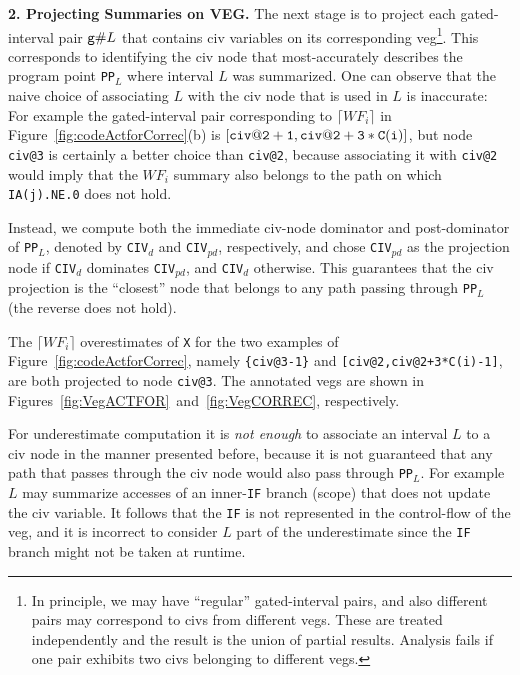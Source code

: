 \documentclass{sig-alternate}
\begin{document}
\vspace{1ex}

{\bf 2. Projecting Summaries on VEG.}
The next stage is to project each gated-interval pair ${\tt g}\#L$ 
that contains {\sc civ} variables on its corresponding {\sc veg}\footnote{  
In principle, we may have ``regular'' gated-interval pairs, and also 
different pairs may correspond to {\sc civ}s from different {\sc veg}s. 
These are treated independently and the result is the union of partial results.
Analysis fails if one pair exhibits two {\sc civ}s belonging
to different {\sc veg}s.}. 
This corresponds to identifying the {\sc civ} node
that most-accurately describes the program point {\tt PP$_L$} 
where interval $L$ was summarized. 
One can observe that the naive choice of associating $L$ with the {\sc civ}
node that is used in $L$ is inaccurate: For example the gated-interval pair
corresponding to $\lceil WF_i \rceil$ in Figure~\ref{fig:codeActforCorrec}(b) 
is $[{\tt civ@2+1, civ@2+3*C(i)}]$, but node {\tt civ@3} 
is certainly a better choice than {\tt civ@2}, because associating
it with {\tt civ@2} would imply that the $WF_i$ summary also belongs 
to the path on which {\tt IA(j).NE.0} does not hold. 


Instead, we compute both the immediate {\sc civ}-node dominator and 
post-dominator of {\tt PP$_L$}, denoted by {\tt CIV}$_{d}$ and 
{\tt CIV}$_{pd}$, respectively, and chose {\tt CIV}$_{pd}$
as the projection node if {\tt CIV}$_{d}$ dominates {\tt CIV}$_{pd}$, 
and {\tt CIV}$_{d}$ otherwise. This guarantees that the {\sc civ} projection
is the ``closest'' node that belongs to any path passing through {\tt PP$_L$}
(the reverse does not hold).

The $\lceil WF_i\rceil$ overestimates of {\tt X} for the two 
examples of Figure~\ref{fig:codeActforCorrec}, namely
{\tt \{civ@3-1\}} and {\tt [civ@2,civ@2+3*C(i)-1]},
are both projected to node {\tt civ@3}. The annotated {\sc veg}s 
are shown in Figures~\ref{fig:VegACTFOR}~and~\ref{fig:VegCORREC}, respectively.
%

For underestimate computation it is {\em not enough} to associate an interval $L$ 
to a {\sc civ} node in the manner presented before, because it is not guaranteed
that any path that passes through the {\sc civ} node would also pass through {\tt PP$_L$}.
For example $L$ may summarize accesses of an inner-{\tt IF} branch 
(scope) that does not update the {\sc civ} variable. It follows that the {\tt IF} 
is not represented in the control-flow of the {\sc veg}, and it is incorrect
to consider $L$ part of the underestimate since the {\tt IF} branch might not be 
taken at runtime.
\end{document}
